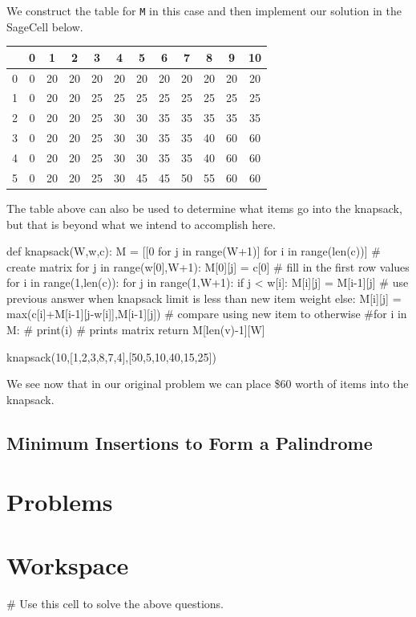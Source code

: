 \documentclass{ximera}
\begin{document}
We construct the table for \verb|M| in this case and then implement our solution in the SageCell below.

\begin{center}
	\begin{tabular}{|c|c|c|c|c|c|c|c|c|c|c|c|}
		\hline
	  & 0 & 1 & 2 & 3 & 4 & 5 & 6 & 7 & 8 & 9 & 10\\
		\hline
	0 & 0  & 20  & 20  & 20  & 20  & 20  & 20  & 20  & 20  & 20  & 20  \\
		\hline
	1 & 0  & 20  & 20  & 25  & 25  & 25  & 25  & 25  & 25  & 25  & 25  \\
		\hline
        2 & 0  & 20  & 20  & 25  & 30  & 30  & 35  & 35  & 35  & 35  & 35  \\
		\hline
	3 & 0  & 20  & 20  & 25  & 30  & 30  & 35  & 35  & 40  & 60  & 60  \\
		\hline
	4 & 0  & 20  & 20  & 25  & 30  & 30  & 35  & 35  & 40  & 60  & 60  \\
		\hline
	5 & 0  & 20  & 20  & 25  & 30  & 45  & 45  & 50  & 55  & 60  & 60  \\
		\hline
	\end{tabular}
\end{center}

The table above can also be used to determine what items go into the knapsack, but that is beyond what we intend to accomplish here. 
\begin{sageCell}
def knapsack(W,w,c):
        M = [[0 for j in range(W+1)] for i in range(len(c))] # create matrix
        for j in range(w[0],W+1):                            
                M[0][j] = c[0]                               # fill in the first row values
        for i in range(1,len(c)):
                for j in range(1,W+1):
                        if j < w[i]:  
                                M[i][j] = M[i-1][j]          # use previous answer when knapsack limit is less than new item weight
                        else:
                                M[i][j] = max(c[i]+M[i-1][j-w[i]],M[i-1][j]) # compare using new item to otherwise
	#for i in M:           
	#        print(i)      # prints matrix
        return M[len(v)-1][W]

knapsack(10,[1,2,3,8,7,4],[50,5,10,40,15,25])
\end{sageCell}

We see now that in our original problem we can place \$60 worth of items into the knapsack.

\subsection{Minimum Insertions to Form a Palindrome}



\section{Problems}


\begin{question}
\end{question}

\section{Workspace}

\begin{sageCell}
# Use this cell to solve the above questions.
\end{sageCell}
\end{document}
